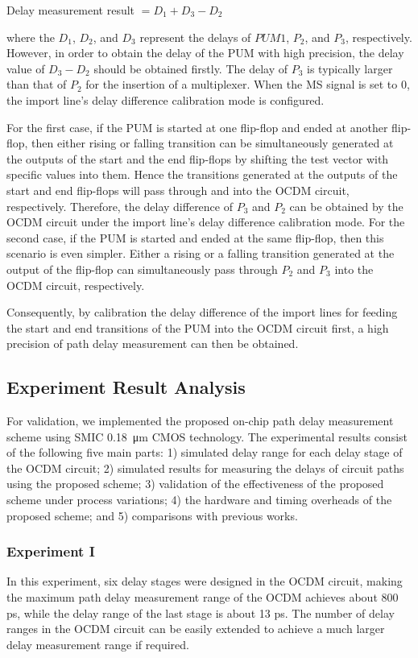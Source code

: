 Delay measurement result $= D_{1} + D_{3} - D_{2}$

where the $D_{1}$, $D_{2}$, and $D_{3}$ represent the delays of $PUM1$, $P_{2}$, and $P_{3}$, respectively. However, in order to obtain the delay of the PUM with high precision, the delay value of $D_{3} - D_{2}$ should be obtained firstly. The delay of $P_{3}$ is typically larger than that of $P_{2}$ for the insertion of a multiplexer. When the MS signal is set to 0, the import line’s delay difference calibration mode is configured.

For the first case, if the PUM is started at one flip-flop and ended at another flip-flop, then either rising or falling transition can be simultaneously generated at the outputs of the start and the end flip-flops by shifting the test vector with specific values into them. Hence the transitions generated at the outputs of the start and end flip-flops will pass through and into the OCDM circuit, respectively. Therefore, the delay difference of $P_{3}$ and $P_{2}$ can be obtained by the OCDM circuit under the import line’s delay difference calibration mode. For the second case, if the PUM is started and ended at the same flip-flop, then this scenario is even simpler. Either a rising or a falling transition generated at the output of the flip-flop can simultaneously pass through $P_{2}$ and $P_{3}$ into the OCDM circuit, respectively.

Consequently, by calibration the delay difference of the import lines for feeding the start and end transitions of the PUM into the OCDM circuit first, a high precision of path delay measurement can then be obtained.

\subsection{Experiment Result Analysis}
For validation, we implemented the proposed on-chip path delay measurement scheme using SMIC \SI{0.18}{\micro\metre} CMOS technology. The experimental results consist of the following five main parts: 1) simulated delay range for each delay stage of the OCDM circuit; 2) simulated results for measuring the delays of circuit paths using the proposed scheme; 3) validation of the effectiveness of the proposed scheme under process variations; 4) the hardware and timing overheads of the proposed scheme; and 5) comparisons with previous works.

\subsubsection{Experiment I}
In this experiment, six delay stages were designed in the OCDM circuit, making the maximum path delay measurement range of the OCDM achieves about 800 ps, while the delay range of the last stage is about 13 ps. The number of delay ranges in the OCDM circuit can be easily extended to achieve a much larger delay measurement range if required. 

